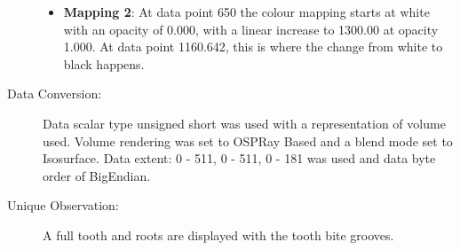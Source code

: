 \begin{description}
	\begin{itemize}
		\tightlist
		\item
		\textbf{Mapping 2}: 
		\hfill \break
			At data point 650 the colour mapping starts at white with an opacity of 0.000, with a linear increase to 1300.00 at opacity 1.000. At data point 1160.642, this is where the change from white to black happens.
	\end{itemize}
	
	\item[Data Conversion:] 
	\hfill \break
		Data scalar type unsigned short was used with a representation of volume used. Volume rendering was set to OSPRay Based and a blend mode set to Isosurface. Data extent: 0 - 511, 0 - 511, 0 - 181 was used and data byte order of BigEndian.
	
	\item[Unique Observation:]
	\hfill \break
		A full tooth and roots are displayed with the tooth bite grooves.
	
\end{description}